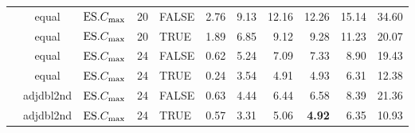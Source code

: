 \begin{table}[ht]
{\begin{tabular}{lcc@{ }c@{ }lrrrrrr}
& equal & $\text{ES}.{C_{\max}}$ & 20 & FALSE & 2.76 & 9.13 & 12.16 & 12.26 & 15.14 & 34.60 
\\ 
& equal & $\text{ES}.{C_{\max}}$ & 20 & TRUE & 1.89 & 6.85 & 9.12 & 9.28 & 11.23 & 20.07 \\ 
& equal & $\text{ES}.{C_{\max}}$ & 24 & FALSE & 0.62 & 5.24 & 7.09 & 7.33 & 8.90 & 19.43 \\ 
& equal & $\text{ES}.{C_{\max}}$ & 24 & TRUE & 0.24 & 3.54 & 4.91 & 4.93 & 6.31 & 12.38 \\ 
& adjdbl2nd & $\text{ES}.{C_{\max}}$ & 24 & FALSE & 0.63 & 4.44 & 6.44 & 6.58 & 8.39 & 
21.36 \\ 
& adjdbl2nd & $\text{ES}.{C_{\max}}$ & 24 & TRUE & 0.57 & 3.31 & 5.06 & \textbf{4.92} & 
6.35 & 10.93 \\ 
\bottomrule
\end{tabular}}
\end{table}